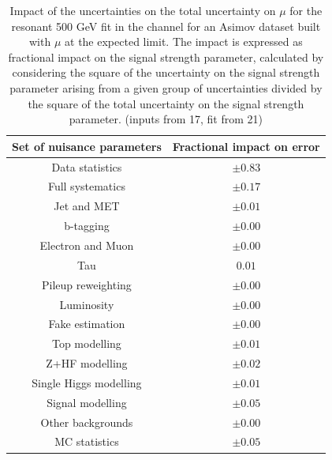 \begin{table}
\centering
\begin{tabular}{|c|c|}
\hline
Set of nuisance parameters & Fractional impact on error\\
\hline
Data statistics & $\pm 0.83$\\
Full systematics & $\pm 0.17$\\
Jet and MET & $\pm 0.01$ \\
b-tagging & $\pm 0.00$\\
Electron and Muon & $\pm 0.00$\\
Tau & $0.01$\\
Pileup reweighting & $\pm 0.00$\\
Luminosity & $\pm 0.00$\\
Fake estimation & $\pm 0.00$\\
Top modelling & $\pm 0.01$\\ 
Z+HF modelling & $\pm 0.02$\\
Single Higgs modelling & $\pm 0.01$\\
Signal modelling & $\pm 0.05$\\
Other backgrounds & $\pm 0.00$\\
MC statistics & $\pm 0.05$\\
\hline
\end{tabular}
\caption{Impact of the uncertainties on the total uncertainty on $\mu$ for the resonant 500 GeV fit in the \hadhad channel for an Asimov dataset built with $\mu$ at the expected limit. The impact is expressed as fractional impact on the signal strength parameter,  calculated by considering the square of the uncertainty on the signal strength parameter arising from a given group of uncertainties divided by the square of the total uncertainty on the signal strength parameter.  (inputs from 17, fit from 21)}
\label{sec:fit:tab:HadHadBreakdown2HDM500Asimov}
\end{table}

